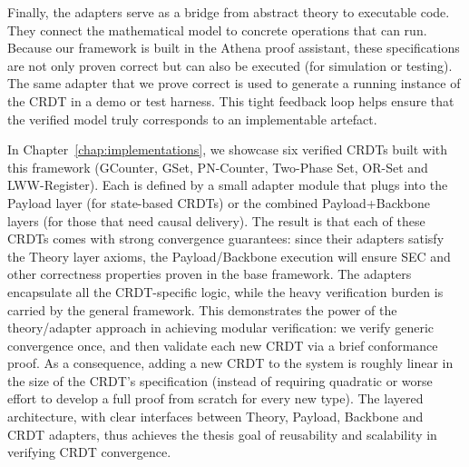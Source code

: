 Finally, the adapters serve as a bridge from abstract theory to executable code. They connect the mathematical model to concrete operations that can run. Because our framework is built in the Athena proof assistant, these specifications are not only proven correct but can also be executed (for simulation or testing). The same adapter that we prove correct is used to generate a running instance of the CRDT in a demo or test harness. This tight feedback loop helps ensure that the verified model truly corresponds to an implementable artefact.

In Chapter~\ref{chap:implementations}, we showcase six verified CRDTs built with this framework (GCounter, GSet, PN-Counter, Two-Phase Set, OR-Set and LWW-Register). Each is defined by a small adapter module that plugs into the Payload layer (for state-based CRDTs) or the combined Payload+Backbone layers (for those that need causal delivery). The result is that each of these CRDTs comes with strong convergence guarantees: since their adapters satisfy the Theory layer axioms, the Payload/Backbone execution will ensure SEC and other correctness properties proven in the base framework. The adapters encapsulate all the CRDT-specific logic, while the heavy verification burden is carried by the general framework. This demonstrates the power of the theory/adapter approach in achieving modular verification: we verify generic convergence once, and then validate each new CRDT via a brief conformance proof. As a consequence, adding a new CRDT to the system is roughly linear in the size of the CRDT’s specification (instead of requiring quadratic or worse effort to develop a full proof from scratch for every new type). The layered architecture, with clear interfaces between Theory, Payload, Backbone and CRDT adapters, thus achieves the thesis goal of reusability and scalability in verifying CRDT convergence.

\endinput
